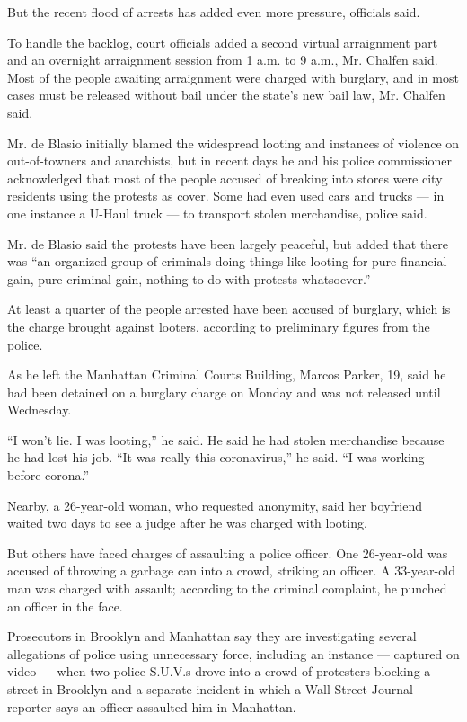 But the recent flood of arrests has added even more pressure, officials
said.

To handle the backlog, court officials added a second virtual
arraignment part and an overnight arraignment session from 1 a.m. to 9
a.m., Mr. Chalfen said. Most of the people awaiting arraignment were
charged with burglary, and in most cases must be released without bail
under the state's new bail law, Mr. Chalfen said.

Mr. de Blasio initially blamed the widespread looting and instances of
violence on out-of-towners and anarchists, but in recent days he and his
police commissioner acknowledged that most of the people accused of
breaking into stores were city residents using the protests as cover.
Some had even used cars and trucks --- in one instance a U-Haul truck
--- to transport stolen merchandise, police said.

Mr. de Blasio said the protests have been largely peaceful, but added
that there was ``an organized group of criminals doing things like
looting for pure financial gain, pure criminal gain, nothing to do with
protests whatsoever.''

At least a quarter of the people arrested have been accused of burglary,
which is the charge brought against looters, according to preliminary
figures from the police.

As he left the Manhattan Criminal Courts Building, Marcos Parker, 19,
said he had been detained on a burglary charge on Monday and was not
released until Wednesday.

``I won't lie. I was looting,'' he said. He said he had stolen
merchandise because he had lost his job. ``It was really this
coronavirus,'' he said. ``I was working before corona.''

Nearby, a 26-year-old woman, who requested anonymity, said her boyfriend
waited two days to see a judge after he was charged with looting.

But others have faced charges of assaulting a police officer. One
26-year-old was accused of throwing a garbage can into a crowd, striking
an officer. A 33-year-old man was charged with assault; according to the
criminal complaint, he punched an officer in the face.

Prosecutors in Brooklyn and Manhattan say they are investigating several
allegations of police using unnecessary force, including an instance ---
captured on video --- when two police S.U.V.s drove into a crowd of
protesters blocking a street in Brooklyn and a separate incident in
which a Wall Street Journal reporter says an officer assaulted him in
Manhattan.

